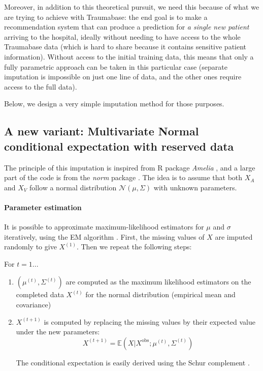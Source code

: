 Moreover, in addition to this theoretical pursuit, we need this because of what we are trying to achieve with Traumabase: the end goal is to make a recommendation system that can produce a prediction for \emph{a single new patient} arriving to the hospital, ideally without needing to have access to the whole Traumabase data (which is hard to share because it contains sensitive patient information). Without access to the initial training data, this means that only a fully parametric approach can be taken in this particular case (separate imputation is impossible on just one line of data, and the other ones require access to the full data).

Below, we design a very simple imputation method for those purposes.

		\subsection{A new variant: Multivariate Normal conditional expectation with reserved data}
The principle of this imputation is inspired from R package \emph{Amelia} \cite{ref_amelia}, and a large part of the code is from the \emph{norm} package \cite{pkg_norm}. The idea is to assume that both $X_A$ and $X_V$ follow a normal distribution $\mathcal{N}(\mu, \Sigma)$ with unknown parameters.

\paragraph{Parameter estimation}
It is possible to approximate maximum-likelihood estimators for $\mu$ and $\sigma$ iteratively, using the EM algorithm \cite{EM} \cite{em_normal_fit}. First, the missing values of $X$ are imputed randomly to give $X^{(1)}$. Then we repeat the following steps:

For $t=1...$
\begin{enumerate}
\item $(\mu^{(t)}, \Sigma^{(t)})$ are computed as the maximum likelihood estimators on the completed data $X^{(t)}$ for the normal distribution (empirical mean and covariance)
\item $X^{(t+1)}$ is computed by replacing the missing values by their expected value under the new parameters: 
$$X^{(t+1)} = \mathbb{E}(X \vert X^{\text{obs}} ; \mu^{(t)}, \Sigma^{(t)})$$

The conditional expectation is easily derived using the Schur complement \cite{norm_schur}.
\end{enumerate}

